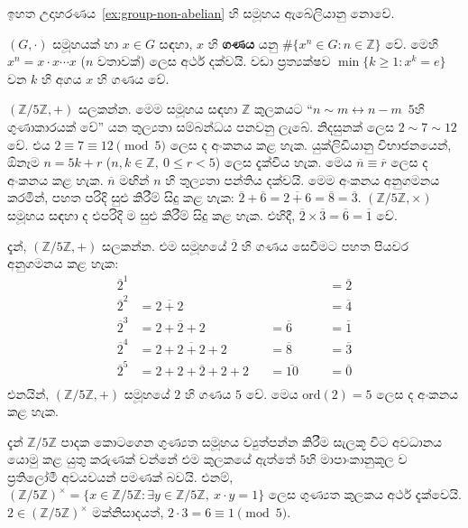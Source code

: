\documentclass[10pt]{book}
\def\ord{\mathrm{ord}}
\begin{document}
ඉහත උදාහරණය~\ref{ex:group-non-abelian} හි සමූහය ඇබේලියානු නොවේ.

\begin{definition}
$(G, \cdot)$ සමූහයක් හා $x\in G$ සඳහා, $x$ හි \textbf{ගණය} යනු $\#\{x^n \in G : n \in \mathbb{Z}\}$ වේ. මෙහි $x^n = x\cdot x\cdots x$ ($n$ වතාවක්) ලෙස අර්ථ දක්වයි. වඩා ප්‍රත්‍යක්ෂව $\min \{k\ge 1: x^k = e\}$ වන $k$ හි අගය $x$ හි ගණය වේ.
\end{definition}

\begin{example}
$(\mathbb{Z}/5\mathbb{Z}, +)$ සලකන්න. මෙම සමූහය සඳහා $\mathbb{Z}$ කුලකයට \enquote{$n \sim m \leftrightarrow n-m$~$5$හි ගුණාකාරයක් ​වේ} ය​න තුල්‍යතා සම්බන්ධය පනවනු ලැබේ. නිදසුනක් ලෙස $2 \sim 7 \sim 12$ වේ. එය $2\equiv 7 \equiv 12 \pmod{5}$ ලෙස ද අංකනය කළ හැක.  යුක්ලිඩියානු විභාජනයෙන්, ඕනෑම $n = 5k + r$ ($n, k \in \mathbb{Z},\ 0\le r < 5$) ලෙස දැක්විය හැක. මෙය $\overline{n} \equiv \overline{r}$ ලෙස ද අංකනය කළ හැක. $\overline{n}$ මඟින් $n$ හි තුල්‍යතා පන්තිය දක්වයි. මෙම අංකනය අනුගමනය කරමින්, පහත පරිදි සුළු කිරීම් සිදු කළ හැක: $\overline{2} + \overline{6} = \overline{2+6} = \overline{8} = \overline{3}$. $(\mathbb{Z}/5\mathbb{Z}, \times)$ සමූහය සඳහා ද එපරිදි ම සුළු කිරීම් සිදු කළ හැක. එහිදී, $\overline{2} \times \overline{3} = \overline{6} = \overline{1}$ වේ.

දැන්, $(\mathbb{Z}/5\mathbb{Z}, +)$ සලකන්න. එම සමූහයේ $\overline{2}$ හි ගණය සෙවීමට පහත පියවර අනුගමනය කළ හැක:
\begin{align*}
\overline{2}^1 &{}                    &&{}              &&&= \overline{2}\\
\overline{2}^2 &=\overline{2+2}       &&{}              &&&= \overline{4}\\
\overline{2}^3 &=\overline{2+2+2}     &&= \overline{6}  &&&= \overline{1} \\
\overline{2}^4 &=\overline{2+2+2+2}   &&= \overline{8}  &&&= \overline{3} \\
\overline{2}^5 &=\overline{2+2+2+2+2} &&= \overline{10} &&&= \overline{0}\\
\end{align*}
එනයින්, $(\mathbb{Z}/5\mathbb{Z}, +)$ සමූහයේ $2$ හි ගණය $5$ වේ. මෙය $\ord(2) = 5$ ලෙස ද අංකනය කළ හැක.

දැන් $\mathbb{Z}/5\mathbb{Z}$ පාදක කොටගෙන ගුණ්‍යත සමූහය ව්‍යුත්පන්න කිරීම සැලකූ වි​ට අවධානය යොමු කළ යුතු කරුණක් වන්නේ එම කුලක​යේ ඇත්තේ $5$හි මාපාංකානුකූල ​ව ප්‍රතිලෝමී අවයවයන් පමණක් බවයි. එනම්, $(\mathbb{Z}/5\mathbb{Z})^\times = \{x \in \mathbb{Z}/5\mathbb{Z}: \exists y \in \mathbb{Z}/5\mathbb{Z},\ x \cdot y = 1\}$ ලෙස ගුණ්‍යත කුලකය අර්ථ දැක්වෙයි.  $2 \in (\mathbb{Z}/5\mathbb{Z})^\times$ මක්නිසාදයත්, $2 \cdot 3 = 6 \equiv 1 \pmod{5}$.


\end{example}
\end{document}
